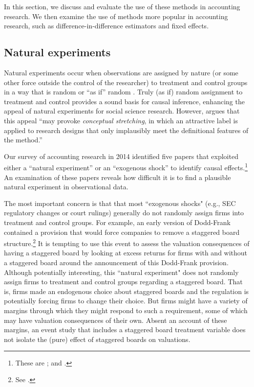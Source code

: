 \documentclass[12pt,reqno,titlepage]{amsart}
\begin{document}
\begin{doublespace}
In this section, we discuss and evaluate the use of these methods in accounting research. 
We then examine the use of methods more popular in accounting research, such as difference-in-difference estimators and fixed effects.

\subsection{Natural experiments}
Natural experiments occur when observations are assigned by nature (or some other force outside the control of the researcher) to treatment and control groups in a way that is random or ``as if'' random \citep{Dunning:2012tt}. 
Truly (as if) random assignment to treatment and control provides a sound basis for causal inference, enhancing the appeal of natural experiments for social science research.
However, \citet[\,p.3, emphasis added]{Dunning:2012tt} argues that this appeal ``may provoke \emph{conceptual stretching}, in which an attractive label is applied to research designs that only implausibly meet the definitional features of the method.'' 

Our survey of accounting research in 2014 identified five papers that exploited either a ``natural experiment'' or an ``exogenous shock'' to identify causal effects.\footnote{These are \citet{Lo:2013jk,Aier:2014ii,Kirk:2014gx,Houston:2014hv}; and \citet{Hail:2014fq}.}
An examination of these papers reveals how difficult it is to find a plausible natural experiment in observational data.

The most important concern is that that most ``exogenous shocks" (e.g., SEC regulatory changes or court rulings) generally do not randomly assign firms into treatment and control groups.
For example, an early version of Dodd-Frank contained a provision that would force companies to remove a staggered board structure.\footnote{See \citet{Larcker:2011hs}.}
It is tempting to use this event to assess the valuation consequences of having a staggered board by looking at excess returns for firms with and without a staggered board around the announcement of this Dodd-Frank provision.
Although potentially interesting, this ``natural experiment" does not randomly assign firms to treatment and control groups regarding a staggered board.  That is, firms made an endogenous choice about staggered boards and the regulation is potentially forcing firms to change their choice. But firms might have a variety of margins through which they might respond to such a requirement, some of which may have valuation consequences of their own. Absent an account of these margins, an event study that includes a staggered board treatment variable does not isolate the (pure) effect of staggered boards on valuations. 


\end{doublespace}
\end{document}
